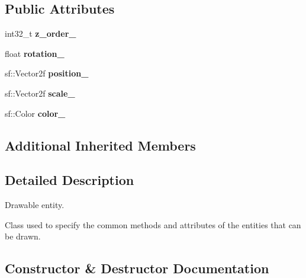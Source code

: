 \subsection*{Public Attributes}
\begin{DoxyCompactItemize}
\item 
\mbox{\label{class_drawable_entity_a7edd7e234484ae696a2820f186109929}} 
int32\+\_\+t {\bfseries z\+\_\+order\+\_\+}
\item 
\mbox{\label{class_drawable_entity_a883df88517413496ba69558f5f32623c}} 
float {\bfseries rotation\+\_\+}
\item 
\mbox{\label{class_drawable_entity_abcda108a72f5c59464f65cbd8c405410}} 
sf\+::\+Vector2f {\bfseries position\+\_\+}
\item 
\mbox{\label{class_drawable_entity_a834104b0d2cddb9d03bffbf251547d90}} 
sf\+::\+Vector2f {\bfseries scale\+\_\+}
\item 
\mbox{\label{class_drawable_entity_ad424f3d5b9ddbc6c556fbc64642e9153}} 
sf\+::\+Color {\bfseries color\+\_\+}
\end{DoxyCompactItemize}
\subsection*{Additional Inherited Members}


\subsection{Detailed Description}
Drawable entity. 

Class used to specify the common methods and attributes of the entities that can be drawn. 

\subsection{Constructor \& Destructor Documentation}
\mbox{\label{class_drawable_entity_a8e9f9afa7c76fdc19e27ca0975ffcb21}} 
